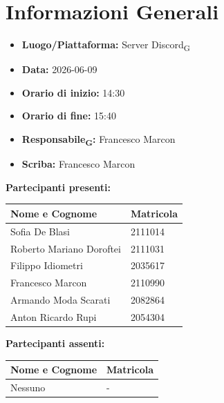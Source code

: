 \section{Informazioni Generali}
\begin{itemize}
    \item \textbf{Luogo/Piattaforma:} Server Discord\textsubscript{G}
    \item \textbf{Data:} 2026-06-09
    \item \textbf{Orario di inizio:} 14:30
    \item \textbf{Orario di fine:} 15:40
    \item \textbf{Responsabile\textsubscript{G}:} Francesco Marcon
    \item \textbf{Scriba:} Francesco Marcon
\end{itemize}

\vspace{0.5cm}
\textbf{Partecipanti presenti:}
\begin{table}[ht]
    \centering
    \renewcommand{\arraystretch}{1.2}
    \begin{tabularx}{\textwidth}{X l}
        \toprule
        \textbf{Nome e Cognome} & \textbf{Matricola} \\
        \midrule
        Sofia De Blasi & 2111014 \\
        Roberto Mariano Doroftei & 2111031 \\
        Filippo Idiometri & 2035617 \\
        Francesco Marcon & 2110990 \\
        Armando Moda Scarati & 2082864 \\
        Anton Ricardo Rupi & 2054304 \\
        \bottomrule
    \end{tabularx}
\end{table}

\vspace{0.5cm}
\textbf{Partecipanti assenti:}
\begin{table}[ht]
    \centering
    \renewcommand{\arraystretch}{1.2}
    \begin{tabularx}{\textwidth}{X l}
        \toprule
        \textbf{Nome e Cognome} & \textbf{Matricola} \\
        \midrule
        Nessuno & - \\
        \bottomrule
    \end{tabularx}
\end{table}

